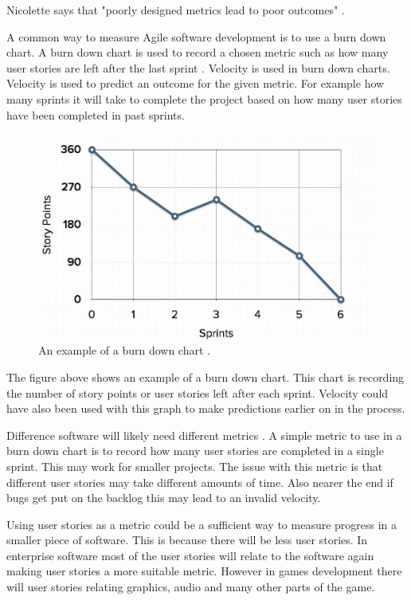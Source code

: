 \documentclass{scrartcl}
\begin{document}
Nicolette says that "poorly designed metrics lead to poor outcomes" \cite[p.2]{Ktata}. %

A common way to measure Agile software development is to use a burn down chart. A burn down chart is used to record a chosen metric such as how many user stories are left after the last sprint \cite{AgileWithScrum}. Velocity is used in burn down charts. Velocity is used to predict an outcome for the given metric. For example how many sprints it will take to complete the project based on how many user stories have been completed in past sprints.

\begin{figure}[h]
	\includegraphics[width=1.0\linewidth]{BDChart.jpg}
	\caption{ An example of a burn down chart \cite{MGS}.}
\end{figure}
	
The figure above shows an example of a burn down chart. This chart is recording the number of story points or user stories left after each sprint. Velocity could have also been used with this graph to make predictions earlier on in the process. 

Difference software will likely need different metrics  \cite{Misra}. %
 A simple metric to use in a burn down chart is to record how many user stories are completed in a single sprint. This may work for smaller projects. The issue with this metric is that different user stories may take different amounts of time. Also nearer the end if bugs get put on the backlog this may lead to an invalid velocity.

Using user stories as a metric could be a sufficient way to measure progress in a smaller piece of software. This is because there will be less user stories. In enterprise software most of the user stories will relate to the software again making user stories a more suitable metric. However in games development there will user stories relating graphics, audio and many other parts of the game. 
\end{document}
